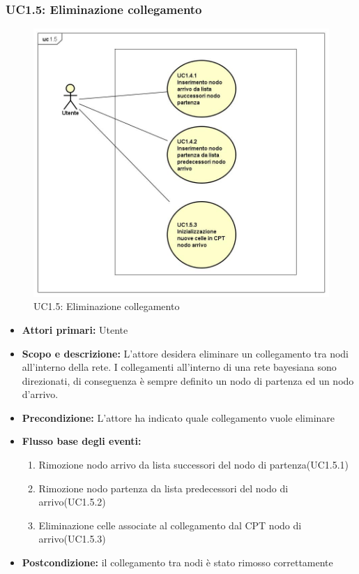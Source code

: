 \subsubsection{UC1.5: Eliminazione collegamento} 
\begin{figure} [H]
	\centering
	\includegraphics[scale=0.45]{Img/UC1-5} 
	\caption{UC1.5: Eliminazione collegamento} \label{} 
\end{figure} 
\begin{itemize} 
	\item{\textbf{Attori primari:} Utente} 
	\item{\textbf{Scopo e descrizione:} L'attore desidera eliminare un collegamento tra nodi all'interno della rete. I collegamenti all'interno di una rete bayesiana sono direzionati, di conseguenza è sempre definito un nodo di partenza ed un nodo d'arrivo.} 
	\item{\textbf{Precondizione:} L'attore ha indicato quale collegamento vuole eliminare} 
	\item{\textbf{Flusso base degli eventi:} } 
		\begin{enumerate} 
			\item{Rimozione nodo arrivo da lista successori del nodo di partenza(UC1.5.1)} 
			\item{Rimozione nodo partenza da lista predecessori del nodo di arrivo(UC1.5.2)} 
			\item{Eliminazione celle associate al collegamento dal CPT nodo di arrivo(UC1.5.3)} 
		\end{enumerate} 
	\item{\textbf{Postcondizione:} il collegamento tra nodi è stato rimosso correttamente} 
\end{itemize} 
